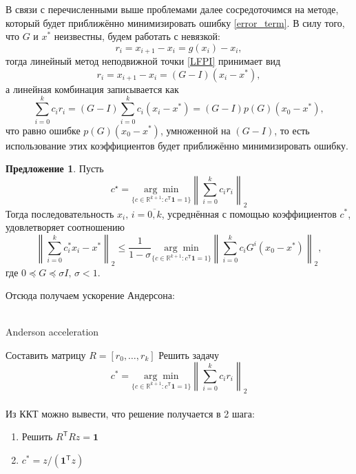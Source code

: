 \documentclass[12pt]{article}
\theoremstyle{definition}
\newtheorem{Prop}{Предложение}
\numberwithin{Def}{section}
\numberwithin{Th}{section}
\numberwithin{Prop}{section}
\numberwithin{St}{section}
\numberwithin{Cor}{section}
\begin{document}
В связи с перечисленными выше проблемами далее сосредоточимся на методе, который
будет приближённо минимизировать ошибку \eqref{error_term}. В силу того, что $G$ 
и $x^*$ неизвестны, будем работать с невязкой:
$$
r_i=x_{i+1}-x_i=g(x_i)-x_i,
$$
тогда линейный метод неподвижной точки \eqref{LFPI} принимает вид
$$
r_i=x_{i+1}-x_i=(G-I)(x_i-x^*),
$$
а линейная комбинация записывается как
$$
\sum_{i=0}^kc_ir_i=(G-I)\sum_{i=0}^k c_i(x_i-x^*)=(G-I)p(G)(x_0-x^*),
$$
что равно ошибке $p(G)(x_0-x^*)$, умноженной на $(G-I)$, то есть использование
этих коэффициентов будет приближённо минимизировать ошибку.

\begin{Prop}\label{prop_sigma}
	Пусть
	$$
	c^\star=\underset{\{c\in\mathbb{R}^{k+1}:c^\mathsf{T}\mathbf{1}=1\}}
	{\arg\min}\left\|\sum_{i=0}^kc_ir_i\right\|_2
	$$
	Тогда последовательность $x_i,\,i=\overline{0,k}$, усреднённая с помощью
	коэффициентов $c^*$, удовлетворяет соотношению
	\begin{equation}\label{approx_bound}
	\left\|\sum_{i=0}^kc_i^*x_i-x^*\right\|_2\leqslant\dfrac1{1-\sigma}
	\underset{\{c\in\mathbb{R}^{k+1}:c^\mathsf{T}\mathbf{1}=1\}}
	{\arg\min}\left\|\sum_{i=0}^kc_iG^i(x_0-x^*)\right\|_2,
	\end{equation}
	где $0\preceq G\preceq\sigma I,\,\sigma<1$.
\end{Prop}

Отсюда получаем ускорение Андерсона:
\\\\
\begin{algorithm*}[H]
\caption{Anderson acceleration}
\LinesNumbered
 Составить матрицу $R=[r_0,\ldots,r_k]$\;
 Решить задачу
 $$
 c^*=\underset{\{c\in\mathbb{R}^{k+1}:c^\mathsf{T}\mathbf{1}=1\}}
	{\arg\min}\left\|\sum_{i=0}^kc_ir_i\right\|_2
 $$
 
 
\end{algorithm*}

\paragraph{}
Из ККТ можно вывести, что решение получается в 2 шага:
\begin{enumerate}
	\item Решить $R^\mathsf{T}Rz=\mathbf{1}$
	\item $c^*=z/(\mathbf{1}^\mathsf{T}z)$
\end{enumerate}
\end{document}
